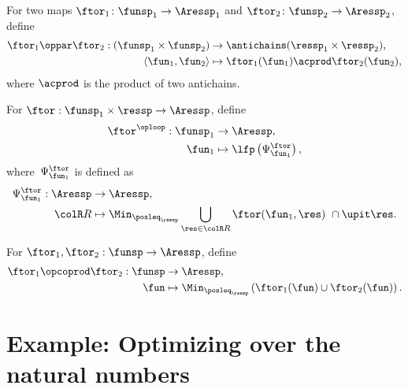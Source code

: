 \begin{definition}
    \label{def:opmaps}
    For two maps $\ftor_{1}\colon\funsp_{1}\rightarrow\Aressp_{1}$
    and $\ftor_{2}\colon\funsp_{2}\rightarrow\Aressp_{2}$, define
    \begin{align}
        \ftor_{1}\oppar\ftor_{2}:(\funsp_{1}\times\funsp_{2}) & \rightarrow\antichains(\ressp_{1}\times\ressp_{2}),\label{eq:oppar}\\
        \left\langle \fun_{1},\fun_{2}\right\rangle  & \mapsto\ftor_{1}(\fun_{1})\acprod\ftor_{2}(\fun_{2}),\nonumber
    \end{align}
    where $\acprod$ is the product of two antichains.
\end{definition}

\begin{definition}
    \label{def:oploop}
    For $\ftor:\funsp_{1}\times\ressp\rightarrow\Aressp$,
    define
    \begin{align}
        \ftor^{\oploop}:\funsp_{1} & \rightarrow\Aressp,\nonumber \\
        \fun_{1} & \mapsto\lfp\left(\Psi_{\fun_{1}}^{\ftor}\right),
    \end{align}
    where~$\Psi_{\fun_{1}}^{\ftor}$ is defined as
    \begin{align}
        \Psi_{\fun_{1}}^{\ftor}:\Aressp & \rightarrow\Aressp,\nonumber \\
        {\colR R} & \mapsto\Min_{\posleq_{\ressp}}\bigcup_{\res\in{\colR R}}\ftor(\fun_{1},\res)\ \cap\upit\res.\label{eq:phi}
    \end{align}
\end{definition}

\begin{definition}
    \label{def:opcoprod}For $\ftor_{1},\ftor_{2}:\funsp\rightarrow\Aressp$,
    define
    \begin{align*}
        \ftor_{1}\opcoprod\ftor_{2}:\funsp & \rightarrow\Aressp,\\
        \fun& \mapsto\Min_{\posleq_{\ressp}}\left(\ftor_{1}(\fun)\cup\ftor_{2}(\fun)\right).
    \end{align*}
\end{definition}


\section{Example: Optimizing over the natural numbers}

